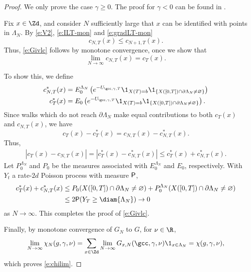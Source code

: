 \begin{proof}
We only prove the case $\gamma \ge 0$. The proof for $\gamma < 0$ can be found in
\cite{BSW-saw-sa}.

Fix $x \in \Zd$, and consider $N$ sufficiently large that $x$ can be identified
with points in $\Lambda_N$.
By \eqref{e:V2}, \eqref{e:ILT-mon} and \eqref{e:gradLT-mon}
\begin{equation}
\label{e:ctmon}
c_{N,T}(x) \leq c_{N+1,T}(x).
\end{equation}
Thus, \eqref{e:Givlc} follows by monotone convergence, once we show that
\begin{equation}
\lim_{N\to\infty} c_{N,T}(x) = c_T(x).
\end{equation}

To show this, we define
\begin{align}
c_{N,T}^*(x)
  &=
E^{\Lambda_N}_0
\left(
  e^{-U_{\gcc,\gamma,T}} \1_{X(T)=b} \1_{\{X([0, T]) \cap \partial \Lambda_N \neq \varnothing\}}
\right) \\
c_T^*(x)
  &=
E_0
\left(
  e^{-U_{\gcc,\gamma,T}} \1_{X(T)=b} \1_{\{X([0, T]) \cap \partial \Lambda_N \neq \varnothing\}}
\right).
\end{align}
Since walks which do not reach $\partial \Lambda_N$ make equal contributions to both
$c_T(x)$ and $c_{N,T}(x)$,
we have
\begin{equation}
c_T(x) - c_T^*(x) = c_{N,T}(x) - c_{N,T}^*(x).
\end{equation}
Thus,
\begin{align}
|c_T(x) - c_{N,T}(x)|
= |c_T^*(x) - c_{N,T}^*(x)|
\leq c_T^*(x) + c_{N,T}^*(x).
\end{align}
Let $P^{\Lambda_N}_0$ and $P_0$ be the measures
associated with $E^{\Lambda_N}_0$ and $E_0$, respectively.
With $Y_t$ a rate-$2d$ Poisson process with measure ${\sf P}$,
\begin{align}
 c_T^*(x) + c_{N,T}^*(x)
  &\leq P_0 (X([0, T]) \cap \partial\Lambda_N \neq \varnothing)
    + P^{\Lambda_N}_0 (X([0, T]) \cap \partial\Lambda_N \neq \varnothing) \nonumber \\
  &\leq 2 {\sf P} (Y_T \geq \diam{\Lambda_N}) \to 0
\end{align}
as $N\to\infty$.
This completes the proof of \eqref{e:Givlc}.

Finally, by monotone convergence of $G_N$ to $G$,
for $\nu \in \R$,
\begin{equation}
\lim_{N\to\infty} \chi_N(g, \gamma, \nu)
    = \sum_{x\in\Zd} \lim_{N\to\infty} G_{x,N}(\gcc,\gamma,\nu) \1_{x\in\Lambda_N}
    = \chi(g, \gamma, \nu),
\end{equation}
which proves \eqref{e:chilim}.
\end{proof}